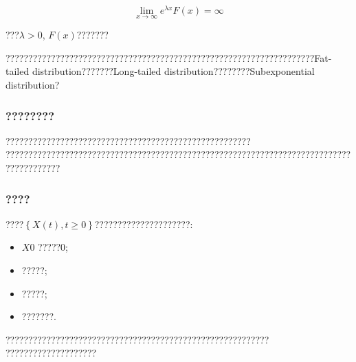 \documentclass[cjk]{beamer}
\begin{document}
\begin{CJK*}{GBK}{song}
\begin{frame}
\begin{displaymath}
\lim_{x\rightarrow \infty }e^{\lambda x}F\left ( x \right )=\infty
\end{displaymath}

???$\lambda>0$, $F(x)$???????

????????????????????????????????????????????????????????????????????Fat-tailed distribution???????Long-tailed distribution????????Subexponential distribution?
\end{frame}

\begin{frame}

\frametitle{????????}
\qquad ???????????????????????????????????{\color{red}{????}}???????????????????
????????????????????????????????????????????????????????????????????????????????????????

\end{frame}

\begin{frame}
\frametitle{????}
\qquad ????$\left \{ X\left ( t \right ),t\geq 0 \right \}$?????????????????????:
\begin{itemize}
\item $X{0}$ ?????0;
\item ?????;
\item ?????;
\item ???????.
\end{itemize}


\qquad ??????????????????????????????????????????????????????????
????????????????????
\end{frame}


\end{CJK*}
\end{document}
